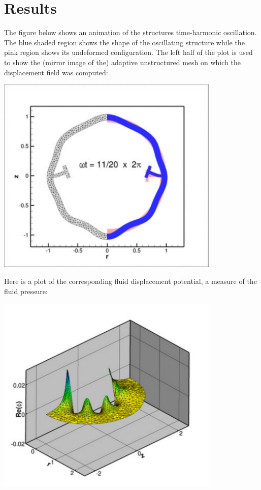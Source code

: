  

\hypertarget{index_results}{}\section{Results}\label{index_results}
The figure below shows an animation of the structure\textquotesingle{}s time-\/harmonic oscillation. The blue shaded region shows the shape of the oscillating structure while the pink region shows its undeformed configuration. The left half of the plot is used to show the (mirror image of the) adaptive unstructured mesh on which the displacement field was computed\+:

 
\begin{DoxyImage}
\includegraphics[width=0.8\textwidth]{anim}
\end{DoxyImage}


Here is a plot of the corresponding fluid displacement potential, a measure of the fluid pressure\+:

 
\begin{DoxyImage}
\includegraphics[width=0.8\textwidth]{potential_unstr}
\end{DoxyImage}


